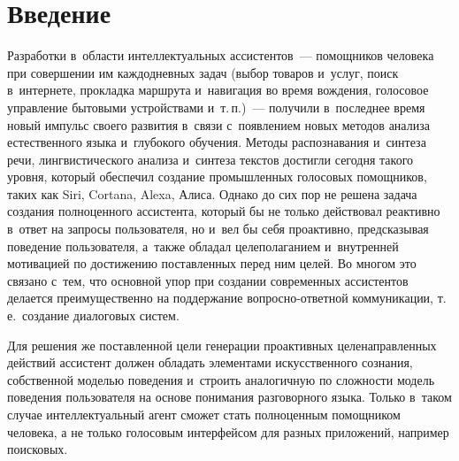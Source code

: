 
  



\thispagestyle{headings}

\begin{multicols}{2}

\label{st\stat}
  
\section{Введение}

  Разработки в~области интеллектуальных ас\-сис\-тен\-тов~--- помощников человека 
при совершении им каждодневных задач (выбор товаров и~услуг, поиск 
в~интернете, прокладка маршрута и~навигация во время вождения, голосовое 
управление бытовыми устройствами и~т.\,п.)~--- получили в~последнее время 
новый импульс своего развития в~связи с~появлением новых методов анализа 
естественного языка и~глубокого обучения. Методы распознавания и~синтеза 
речи, лингвистического анализа и~синтеза текстов достигли сегодня такого 
уровня, который обеспечил создание промышленных голосовых помощников, 
таких как Siri, Cortana, Alexa, Алиса. 
%
Однако до сих пор не решена задача 
создания полноценного ассистента, который бы не только действовал 
реактивно в~ответ на запросы пользователя, но и~вел бы себя проактивно, 
предсказывая поведение пользователя, а~также обладал целеполаганием 
и~внутренней мотивацией по достижению поставленных перед ним целей. Во
многом это связано с~тем, что основной упор при создании современных 
ассистентов делается преимущественно на поддержание  
воп\-рос\-но-от\-вет\-ной коммуникации, т.\,е.\ создание диалоговых \mbox{систем}. 
  
  Для решения же поставленной цели генерации проактивных 
целенаправленных действий ассистент должен обладать элементами 
искусственного сознания, собственной моделью поведения и~строить 
аналогичную по сложности модель поведения пользователя на основе 
понимания разговорного языка. Только в~таком случае интеллектуальный агент 
сможет стать полноценным помощником человека, а не только голосовым 
интерфейсом для разных приложений, например поисковых.
  

\end{multicols}
